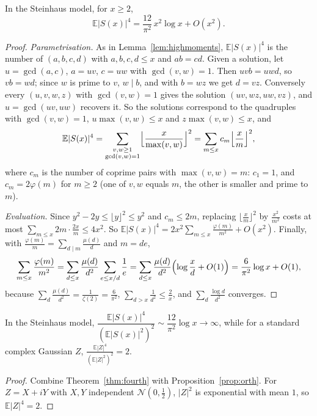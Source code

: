 \begin{theorem}\label{thm:fourth}
In the Steinhaus model, for $x\ge2$,
\[
\mathbb E|S(x)|^4=\frac{12}{\pi^2}\,x^2\log x+O(x^2).
\]
\end{theorem}
\begin{proof}
\emph{Parametrisation.} As in Lemma~\ref{lem:highmoments}, $\mathbb E|S(x)|^4$ is the number of $(a,b,c,d)$ with $a,b,c,d\le x$ and $ab=cd$. Given a solution, let $u=\gcd(a,c)$, $a=uv$, $c=uw$ with $\gcd(v,w)=1$. Then $uvb=uwd$, so $vb=wd$; since $w$ is prime to $v$, $w\mid b$, and with $b=wz$ we get $d=vz$. Conversely every $(u,v,w,z)$ with $\gcd(v,w)=1$ gives the solution $(uv,wz,uw,vz)$, and $u=\gcd(uv,uw)$ recovers it. So the solutions correspond to the quadruples with $\gcd(v,w)=1$, $u\max(v,w)\le x$ and $z\max(v,w)\le x$, and
\[
\mathbb E|S(x)|^4=\sum_{\substack{v,w\ge1\\\gcd(v,w)=1}}\Bigl\lfloor\frac x{\max(v,w)}\Bigr\rfloor^2=\sum_{m\le x}c_m\Bigl\lfloor\frac xm\Bigr\rfloor^2,
\]
where $c_m$ is the number of coprime pairs with $\max(v,w)=m$: $c_1=1$, and $c_m=2\varphi(m)$ for $m\ge2$ (one of $v,w$ equals $m$, the other is smaller and prime to $m$).

\emph{Evaluation.} Since $y^2-2y\le\lfloor y\rfloor^2\le y^2$ and $c_m\le2m$, replacing $\lfloor\frac xm\rfloor^2$ by $\frac{x^2}{m^2}$ costs at most $\sum_{m\le x}2m\cdot\frac{2x}m\le4x^2$. So $\mathbb E|S(x)|^4=2x^2\sum_{m\le x}\frac{\varphi(m)}{m^2}+O(x^2)$. Finally, with $\frac{\varphi(m)}m=\sum_{d\mid m}\frac{\mu(d)}d$ and $m=de$,
\[
\sum_{m\le x}\frac{\varphi(m)}{m^2}=\sum_{d\le x}\frac{\mu(d)}{d^2}\sum_{e\le x/d}\frac1e=\sum_{d\le x}\frac{\mu(d)}{d^2}\Bigl(\log\frac xd+O(1)\Bigr)=\frac6{\pi^2}\log x+O(1),
\]
because $\sum_d\frac{\mu(d)}{d^2}=\frac1{\zeta(2)}=\frac6{\pi^2}$, $\sum_{d>x}\frac1{d^2}\le\frac2x$, and $\sum_d\frac{\log d}{d^2}$ converges.
\end{proof}

\begin{corollary}\label{cor:kurtosis}
In the Steinhaus model, $\dfrac{\mathbb E|S(x)|^4}{(\mathbb E|S(x)|^2)^2}\sim\dfrac{12}{\pi^2}\log x\to\infty$, while for a standard complex Gaussian $Z$, $\frac{\mathbb E|Z|^4}{(\mathbb E|Z|^2)^2}=2$.
\end{corollary}
\begin{proof}
Combine Theorem~\ref{thm:fourth} with Proposition~\ref{prop:orth}. For $Z=X+iY$ with $X,Y$ independent $\mathcal N(0,\frac12)$, $|Z|^2$ is exponential with mean $1$, so $\mathbb E|Z|^4=2$.
\end{proof}

